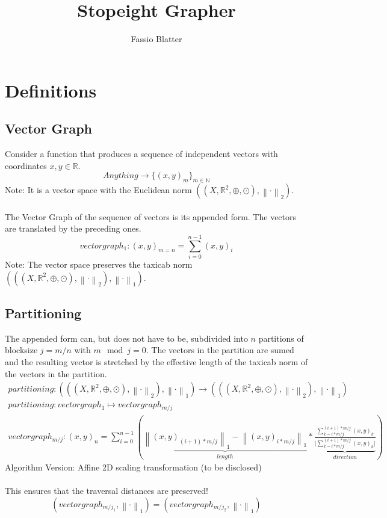 \documentclass{report}
\newcommand\norm[1]{\left\lVert#1\right\rVert}
\begin{document}
\title{Stopeight Grapher}
\author{Fassio Blatter}
\maketitle

\chapter{Definitions}
\section{Vector Graph}
Consider a function that produces a sequence of independent vectors with coordinates $x,y \in \mathbb{R}$.
\begin{equation}
Anything \rightarrow \{(x,y)_{m}\}_{m \in \mathbb{N}}
\end{equation}
Note: It is a vector space with the Euclidean norm $((X,\mathbb{R}^2,\oplus,\odot),\norm{\cdot}_2)$.\\\\
The Vector Graph of the sequence of vectors is its appended form. The vectors are translated by the preceding ones.\\
\begin{equation}
vectorgraph_{1}: (x,y)_{m=n}=\sum_{i=0}^{n-1} (x,y)_{i}
\end{equation}
Note: The vector space preserves the taxicab norm $(((X,\mathbb{R}^2,\oplus,\odot),\norm{\cdot}_2),\norm{\cdot}_1)$.
\section{Partitioning}
The appended form can, but does not have to be, subdivided into $n$ partitions of blocksize $j=m/n$ with $m\mod j=0$. The vectors in the partition are sumed and the resulting vector is stretched by the effective length of the taxicab norm of the vectors in the partition.
\begin{align}
partitioning: (((X,\mathbb{R}^2,\oplus,\odot),\norm{\cdot}_2),\norm{\cdot}_1) \rightarrow (((X,\mathbb{R}^2,\oplus,\odot),\norm{\cdot}_2),\norm{\cdot}_1)\\
partitioning: vectorgraph_{1} \mapsto vectorgraph_{m/j}\\
vectorgraph_{m/j}:(x,y)_{n}=\sum_{i=0}^{n-1} (\underbrace{\norm{(x,y)_{(i+1)*m/j}}_{1} - \norm{(x,y)_{i*m/j}}_{1}}_{length} * \underbrace{\frac{\sum_{k=i*m/j}^{(i+1)*m/j} (x,y)_{k}}{\vert \sum_{k=i*m/j}^{(i+1)*m/j} (x,y)_{k} \vert}}_{direction})
\end{align}
Algorithm Version: Affine 2D scaling transformation (to be disclosed)\\\\
This ensures that the traversal distances are preserved!
\begin{equation}
(vectorgraph_{m/j_{1}},\norm{\cdot}_{1})=(vectorgraph_{m/j_{2}},\norm{\cdot}_{1})
\end{equation}
\end{document}
